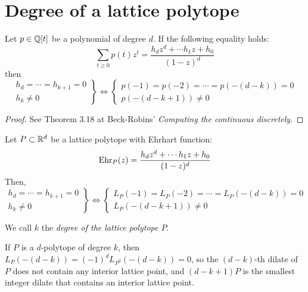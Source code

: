 \bigskip
\section{Degree of a lattice polytope}

\begin{observation}
  Let $p\in\mathbb{Q}[t]$ be a polynomial of degree $d$. If the following equality holds:
  \[
    \sum_{t\geq 0}p(t)z^t = \frac{h_dz^d+\cdots h_1z+h_0}{(1-z)^d}
  \]
  then
  \[
    \left.\begin{array}{r}
	     h_d=\cdots=h_{k+1}=0\\
	     h_k\neq0
          \end{array}\right\}
    \Longleftrightarrow
    \left\{\begin{array}{l}
             p(-1)=p(-2)=\cdots=p(-(d-k))=0\\
             p(-(d-k+1))\neq0
           \end{array}\right.
  \]
\end{observation}

\begin{proof}
  See Theorem 3.18 at Beck-Robins' \emph{Computing the continuous discretely}.
\end{proof}

\begin{proposition}
  Let $P\subset\mathbb{R}^d$ be a lattice polytope with Ehrhart function:
  \[
    \operatorname{Ehr}_P(z) = \frac{h_dz^d+\cdots h_1z+h_0}{(1-z)^d}
  \]
  Then,
  \[
    \left.\begin{array}{r}
	     h_d=\cdots=h_{k+1}=0\\
	     h_k\neq0
          \end{array}\right\}
    \Longleftrightarrow
    \left\{\begin{array}{l}
             L_P(-1)=L_P(-2)=\cdots=L_P(-(d-k))=0\\
             L_P(-(d-k+1))\neq0
           \end{array}\right.
  \]
\end{proposition}

\begin{definition}
  We call $k$ the \emph{degree of the lattice polytope $P$}.
\end{definition}

\begin{observation}
  If $P$ is a $d$-polytope of degree $k$, then $L_P(-(d-k))=(-1)^d L_{P^0}(-(d-k))=0$, so the $(d-k)$-th dilate of $P$ does not contain any interior lattice point, and $(d-k+1)P$ is the smallest integer dilate that contains an interior lattice point.
\end{observation}

